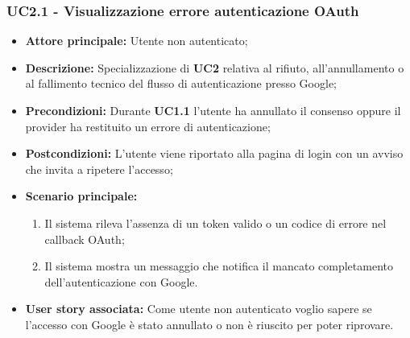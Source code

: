 \subsubsection{UC2.1 - Visualizzazione errore autenticazione OAuth}
\begin{itemize}
    \item \textbf{Attore principale:} Utente non autenticato;
    \item \textbf{Descrizione:} Specializzazione di \textbf{UC2} relativa al rifiuto, all'annullamento o al fallimento tecnico del flusso di autenticazione presso Google;
    \item \textbf{Precondizioni:} Durante \textbf{UC1.1} l'utente ha annullato il consenso oppure il provider ha restituito un errore di autenticazione;
    \item \textbf{Postcondizioni:} L'utente viene riportato alla pagina di login con un avviso che invita a ripetere l'accesso;
    \item \textbf{Scenario principale:}
    \begin{enumerate}
        \item Il sistema rileva l'assenza di un token valido o un codice di errore nel callback OAuth;
        \item Il sistema mostra un messaggio che notifica il mancato completamento dell'autenticazione con Google.
    \end{enumerate}
    \item \textbf{User story associata:} Come utente non autenticato voglio sapere se l'accesso con Google è stato annullato o non è riuscito per poter riprovare.
\end{itemize}

